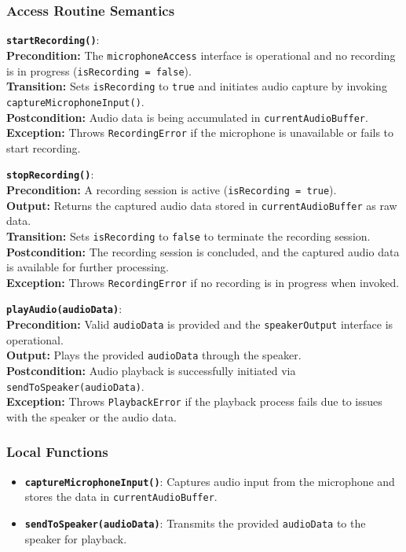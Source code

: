 \documentclass[12pt, titlepage]{article}
\begin{document}
\subsubsection{Access Routine Semantics}

\noindent \textbf{\texttt{startRecording()}}: \\
\textbf{Precondition:} The \texttt{microphoneAccess} interface is operational and no recording is in progress (\texttt{isRecording = false}). \\
\textbf{Transition:} Sets \texttt{isRecording} to \texttt{true} and initiates audio capture by invoking \texttt{captureMicrophoneInput()}. \\
\textbf{Postcondition:} Audio data is being accumulated in \texttt{currentAudioBuffer}. \\
\textbf{Exception:} Throws \texttt{RecordingError} if the microphone is unavailable or fails to start recording.

\vspace{2mm}
\noindent \textbf{\texttt{stopRecording()}}: \\
\textbf{Precondition:} A recording session is active (\texttt{isRecording = true}). \\
\textbf{Output:} Returns the captured audio data stored in \texttt{currentAudioBuffer} as raw data. \\
\textbf{Transition:} Sets \texttt{isRecording} to \texttt{false} to terminate the recording session. \\
\textbf{Postcondition:} The recording session is concluded, and the captured audio data is available for further processing. \\
\textbf{Exception:} Throws \texttt{RecordingError} if no recording is in progress when invoked.

\vspace{2mm}
\noindent \textbf{\texttt{playAudio(audioData)}}: \\
\textbf{Precondition:} Valid \texttt{audioData} is provided and the \texttt{speakerOutput} interface is operational. \\
\textbf{Output:} Plays the provided \texttt{audioData} through the speaker. \\
\textbf{Postcondition:} Audio playback is successfully initiated via \texttt{sendToSpeaker(audioData)}. \\
\textbf{Exception:} Throws \texttt{PlaybackError} if the playback process fails due to issues with the speaker or the audio data.

\subsubsection{Local Functions}
\begin{itemize}
    \item \textbf{\texttt{captureMicrophoneInput()}}: Captures audio input from the microphone and stores the data in \texttt{currentAudioBuffer}.
    \item \textbf{\texttt{sendToSpeaker(audioData)}}: Transmits the provided \texttt{audioData} to the speaker for playback.
\end{itemize}
\end{document}
